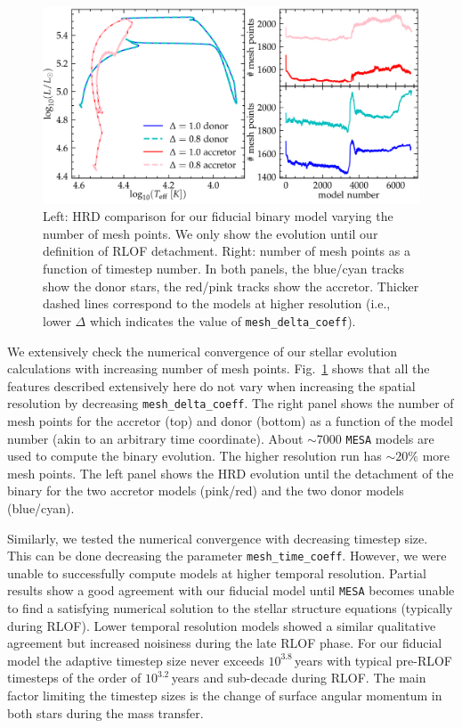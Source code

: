 \documentclass[twocolumn,twocolappendix,trackchanges]{aastex63}
\DeclareRobustCommand{\Figref}[1]{Fig.~\ref{#1}}
\begin{document}
\begin{figure}[hp]
  \centering
  \includegraphics[width=\textwidth]{spatial_res_plot}
  \caption{Left: HRD comparison for our fiducial binary model varying
  the number of mesh points. We only show the evolution until our definition
  of RLOF detachment. Right: number of mesh points as a
  function of timestep number. In both panels, the blue/cyan tracks show the donor stars, the
red/pink tracks show the accretor. Thicker dashed lines correspond to
the models at higher resolution (i.e., lower $\Delta$ which indicates
the value of \texttt{mesh\_delta\_coeff}).}
\label{fig:sp_test}
\end{figure}



We extensively check the numerical convergence of our stellar
evolution calculations with increasing number of mesh
points. \Figref{fig:sp_test} shows that all the features described
extensively here do not vary when increasing the spatial resolution by
decreasing \texttt{mesh\_delta\_coeff}. The right panel shows the
number of mesh points for the accretor (top) and donor (bottom) as a
function of the model number (akin to an arbitrary time
coordinate). About $\sim$7000 \texttt{MESA} models are used to compute
the binary evolution. The higher resolution run has $\sim 20\%$ more
mesh points. The left panel shows the HRD evolution until the
detachment of the binary for the two accretor models (pink/red) and
the two donor models (blue/cyan).

Similarly, we tested the numerical convergence with decreasing
timestep size. This can be done decreasing the parameter
\texttt{mesh\_time\_coeff}. However, we were unable to successfully
compute models at higher temporal resolution. Partial results show a
good agreement with our fiducial model until \texttt{MESA} becomes
unable to find a satisfying numerical solution to the stellar
structure equations (typically
during RLOF). Lower temporal resolution models showed a similar
qualitative agreement but increased noisiness during the late RLOF
phase. For our fiducial model the adaptive timestep size never exceeds
$10^{3.8}$\,years with typical pre-RLOF timesteps of the order of $10^{3.2}$\,years
and sub-decade during RLOF. The main factor limiting the timestep
sizes is the change of surface angular momentum in both stars during
the mass transfer.
\end{document}

